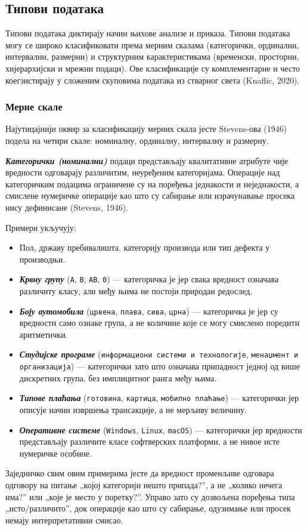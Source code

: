 \subsection{Типови података}
Типови података диктирају начин њихове анализе и приказа. Типови података могу се широко класификовати према мерним скалама (категорички, ординални, интервални, размерни) и структурним карактеристикама (временски, просторни, хијерархијски и мрежни подаци). Ове класификације су комплементарне и често коегзистирају у сложеним скуповима података из стварног света (Knaflic, 2020).

\subsubsection{Мерне скале}
Најутицајнији оквир за класификацију мерних скала јесте Stevens-ова (1946) подела на четири скале: номиналну, ординалну, интервалну и размерну. 

\textbf{\textit{Категорички (номинални)}} подаци представљају квалитативне атрибуте чије вредности одговарају различитим, неуређеним категоријама. Операције над категоричким подацима ограничене су на поређења једнакости и неједнакости, а смислене нумеричке операције као што су сабирање или израчунавање просека нису дефинисане (Stevens, 1946).

Примери укључују: 

\begin{itemize}
  \item Пол, државу пребивалишта, категорију производа или тип дефекта у производњи. 
  \item \textbf{\textit{Крвну групу}} (\texttt{A}, \texttt{B}, \texttt{AB}, \texttt{0}) — категоричка је јер свака вредност означава различиту класу, али међу њима не постоји природан редослед.
  \item \textbf{\textit{Боју аутомобила}} (\texttt{црвена}, \texttt{плава}, \texttt{сива}, \texttt{црна}) — категоричка је јер су вредности само ознаке група, а не количине које се могу смислено поредити аритметички.
  \item \textbf{\textit{Студијске програме}} (\texttt{информациони системи и технологије}, \texttt{менаџмент и организација}) — категорички зато што означава припадност једној од више дискретних група, без имплицитног ранга међу њима.
  \item \textbf{\textit{Типове плаћања}} (\texttt{готовина}, \texttt{картица}, \texttt{мобилно плаћање}) — категорички јер описује начин извршења трансакције, а не мерљиву величину.
  \item \textbf{\textit{Оперативне системе}} (\texttt{Windows}, \texttt{Linux}, \texttt{macOS}) — категорички јер вредности представљају различите класе софтверских платформи, а не нивое исте нумеричке особине.
\end{itemize}
Заједничко свим овим примерима јесте да вредност променљиве одговара одговору на питање „којој категорији нешто припада?”, а не „колико нечега има?” или „које је место у поретку?”. Управо зато су дозвољена поређења типа „исто/различито”, док операције као што су сабирање, одузимање или просек немају интерпретативни смисао.

